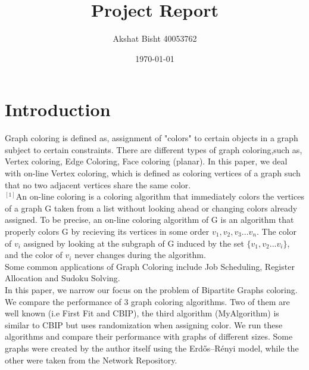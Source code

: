 \documentclass{article}
\begin{document}
\title{Project Report}
\author{Akshat Bisht 40053762}
\date{\today}
\maketitle

\newpage


\section{Introduction}
Graph coloring is defined as, assignment of "colors" to certain objects in a graph subject to certain constraints.
There are different types of graph coloring,such as, Vertex coloring, Edge Coloring, Face coloring (planar).
 In this paper, we deal with on-line Vertex coloring, which is defined as 
coloring vertices of a graph such that no two adjacent vertices share the same color.\\

$^{[1]}$An on-line coloring is a coloring algorithm that immediately colors the vertices of a graph G taken from a list without looking ahead or changing colors already assigned. To be precise, an on-line coloring algorithm of G is an algorithm that properly colors G by recieving its vertices in some order $v_1,v_2,v_3...v_n$. The color of $v_i$ assigned by looking at the subgraph of G induced by the set $\{v_1,v_2...v_i\}$, and the color of $v_i$ never changes during the algorithm.\\

Some common applications of Graph Coloring include Job Scheduling, Register Allocation and Sudoku Solving.\\

In this paper, we narrow our focus on the problem of Bipartite Graphs coloring.
We compare the performance of 3 graph coloring algorithms. 
Two of them are well known (i.e First Fit and CBIP), the third algorithm (MyAlgorithm) is similar to CBIP but uses randomization when
 assigning color. We run these algorithms and compare their performance with graphs of different sizes. Some graphs were created by the author itself using the Erdős–Rényi model, while the other were taken from the Network Repository.\\
\end{document}
